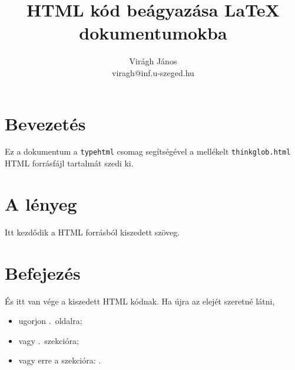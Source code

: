 \documentclass{article}
\author{Virágh János \\ viragh@inf.u-szeged.hu}
\title{HTML kód beágyazása \LaTeX{} dokumentumokba}
\begin{document}
\maketitle
\tableofcontents
\section{Bevezetés} \label{sec:bev}

Ez a dokumentum a \texttt{typehtml} csomag segítségével a mellékelt  \texttt{thinkglob.html}
HTML forrásfájl tartalmát szedi ki.

\hulipsum[1-3]

\section{A lényeg}\label{sec:lenyeg}
Itt kezdődik a HTML forrásból kiszedett szöveg.\label{p:HTML kezdete}
\section{Befejezés}\label{sec:vege}
És itt van vége a kiszedett HTML kódnak.
Ha újra az elejét szeretné látni,
\begin{itemize}
\item ugorjon .~oldalra;
\item vagy  .~szekcióra;
\item vagy erre a szekcióra: .
\end{itemize}
\end{document}
